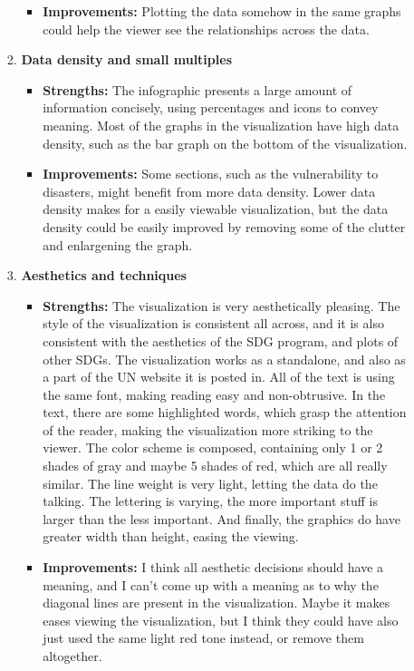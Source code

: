 \documentclass[11pt,a4paper,titlepage]{article}
\begin{document}
\begin{enumerate}
\begin{enumerate}
\begin{enumerate}
\begin{itemize}
                    \item \textbf{Improvements:} Plotting the data somehow in the same graphs could help the viewer see the relationships across the data.
                \end{itemize}
            \item \textbf{Data density and small multiples}
                \begin{itemize}
                    \item \textbf{Strengths:} The infographic presents a large amount of information concisely, using percentages and icons to convey meaning. Most of the graphs in the visualization have high data density, such as the bar graph on the bottom of the visualization.
                    \item \textbf{Improvements:} Some sections, such as the vulnerability to disasters, might benefit from more data density. Lower data density makes for a easily viewable visualization, but the data density could be easily improved by removing some of the clutter and enlargening the graph.
                \end{itemize}
            \item \textbf{Aesthetics and techniques}
                \begin{itemize}
                    \item \textbf{Strengths:} The visualization is very aesthetically pleasing. The style of the visualization is consistent all across, and it is also consistent with the aesthetics of the SDG program, and plots of other SDGs. The visualization works as a standalone, and also as a part of the UN website it is posted in. All of the text is using the same font, making reading easy and non-obtrusive. In the text, there are some highlighted words, which grasp the attention of the reader, making the visualization more striking to the viewer. The color scheme is composed, containing only 1 or 2 shades of gray and maybe 5 shades of red, which are all really similar. The line weight is very light, letting the data do the talking. The lettering is varying, the more important stuff is larger than the less important. And finally, the graphics do have greater width than height, easing the viewing.
                    \item \textbf{Improvements:} I think all aesthetic decisions should have a meaning, and I can't come up with a meaning as to why the diagonal lines are present in the visualization. Maybe it makes eases viewing the visualization, but I think they could have also just used the same light red tone instead, or remove them altogether.
                \end{itemize}
        \end{enumerate}
\end{enumerate}
    
\end{enumerate}
\end{document}
